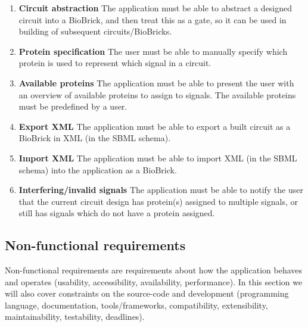 \documentclass[a4paper]{article}
\begin{document}
\begin{enumerate}
\item \textbf{Circuit abstraction} The application must be able to abstract a designed circuit into a BioBrick, and then treat this as a gate, so it can be used in building of subsequent circuits/BioBricks. 

\item \textbf{Protein specification} The user must be able to manually specify which protein is used to represent which signal in a circuit.

\item \textbf{Available proteins} The application must be able to present the user with an overview of available proteins to assign to signals. The available proteins must be predefined by a user.

\item \textbf{Export XML} The application must be able to export a built circuit as a BioBrick in XML (in the SBML schema).
\item \textbf{Import XML} The application must be able to import XML (in the SBML schema) into the application as a BioBrick.
\item \textbf{Interfering/invalid signals} The application must be able to notify the user that the current circuit design has protein(s) assigned to multiple signals, or still has signals which do not have a protein assigned.
\end{enumerate}

\subsection{Non-functional requirements}
Non-functional requirements are requirements about how the application behaves and operates (usability, accessibility, availability, performance). In this section we will also cover constraints on the source-code and development (programming language, documentation, tools/frameworks, compatibility, extensibility, maintainability, testability, deadlines).
\end{document}
